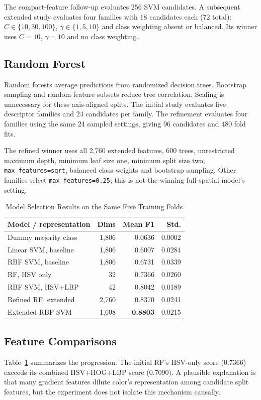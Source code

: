 \documentclass[conference]{IEEEtran}
\begin{document}
The compact-feature follow-up evaluates 256 SVM candidates. A subsequent extended study evaluates four families with 18 candidates each (72 total): $C\in\{10,30,100\}$, $\gamma\in\{1,5,10\}$ and class weighting absent or balanced. Its winner uses $C=10$, $\gamma=10$ and no class weighting.

\subsection{Random Forest}
Random forests average predictions from randomized decision trees. Bootstrap sampling and random feature subsets reduce tree correlation. Scaling is unnecessary for these axis-aligned splits. The initial study evaluates five descriptor families and 24 candidates per family. The refinement evaluates four families using the same 24 sampled settings, giving 96 candidates and 480 fold fits.

The refined winner uses all 2,760 extended features, 600 trees, unrestricted maximum depth, minimum leaf size one, minimum split size two, \texttt{max\_features=sqrt}, balanced class weights and bootstrap sampling. Other families select \texttt{max\_features=0.25}; this is not the winning full-spatial model's setting.

\begin{table}[t]
\caption{Model Selection Results on the Same Five Training Folds}
\label{tab:models}\centering
\begin{tabular}{lrrr}\toprule
Model / representation & Dims & Mean F1 & Std.\\\midrule
Dummy majority class & 1,806 & 0.0636 & 0.0002\\
Linear SVM, baseline & 1,806 & 0.6007 & 0.0284\\
RBF SVM, baseline & 1,806 & 0.6731 & 0.0339\\
RF, HSV only & 32 & 0.7366 & 0.0260\\
RBF SVM, HSV+LBP & 42 & 0.8042 & 0.0189\\
Refined RF, extended & 2,760 & 0.8370 & 0.0241\\
Extended RBF SVM & 1,608 & \textbf{0.8803} & 0.0215\\\bottomrule
\end{tabular}
\end{table}

\subsection{Feature Comparisons}
Table~\ref{tab:models} summarizes the progression. The initial RF's HSV-only score (0.7366) exceeds its combined HSV+HOG+LBP score (0.7090). A plausible explanation is that many gradient features dilute color's representation among candidate split features, but the experiment does not isolate this mechanism causally.
\end{document}
